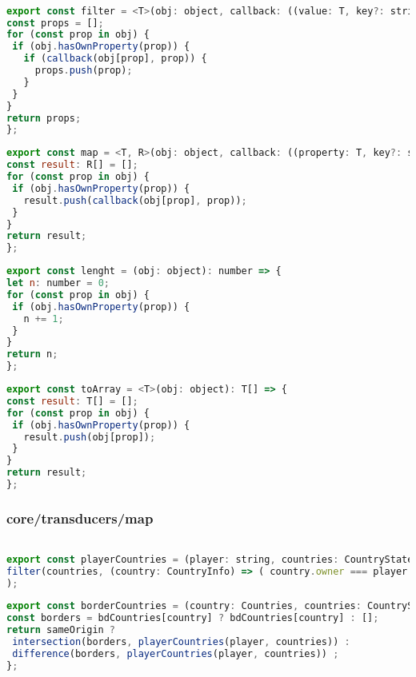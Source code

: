 \documentclass[rel_mlp]{iiufrgs}
\begin{document}
\begin{lstlisting}[language=JavaScript]

export const filter = <T>(obj: object, callback: ((value: T, key?: string) => boolean)): string[] => {
const props = [];
for (const prop in obj) {
 if (obj.hasOwnProperty(prop)) {
   if (callback(obj[prop], prop)) {
     props.push(prop);
   }
 }
}
return props;
};
\end{lstlisting}
\begin{lstlisting}[language = JavaScript]
export const map = <T, R>(obj: object, callback: ((property: T, key?: string) => R)): R[] => {
const result: R[] = [];
for (const prop in obj) {
 if (obj.hasOwnProperty(prop)) {
   result.push(callback(obj[prop], prop));
 }
}
return result;
};
\end{lstlisting}
\begin{lstlisting}[language = JavaScript]
export const lenght = (obj: object): number => {
let n: number = 0;
for (const prop in obj) {
 if (obj.hasOwnProperty(prop)) {
   n += 1;
 }
}
return n;
};
\end{lstlisting}
\begin{lstlisting}[language = JavaScript]
export const toArray = <T>(obj: object): T[] => {
const result: T[] = [];
for (const prop in obj) {
 if (obj.hasOwnProperty(prop)) {
   result.push(obj[prop]);
 }
}
return result;
};

\end{lstlisting}

\subsubsection{core/transducers/map}
\begin{lstlisting}[language=JavaScript]

export const playerCountries = (player: string, countries: CountryState, minTroops: number = 0) => (
filter(countries, (country: CountryInfo) => ( country.owner === player && country.troops > minTroops))
);
\end{lstlisting}
\begin{lstlisting}[language = JavaScript]
export const borderCountries = (country: Countries, countries: CountryState, player: string, sameOrigin: boolean = true) => {
const borders = bdCountries[country] ? bdCountries[country] : [];
return sameOrigin ?
 intersection(borders, playerCountries(player, countries)) :
 difference(borders, playerCountries(player, countries)) ;
};

\end{lstlisting}
\end{document}
